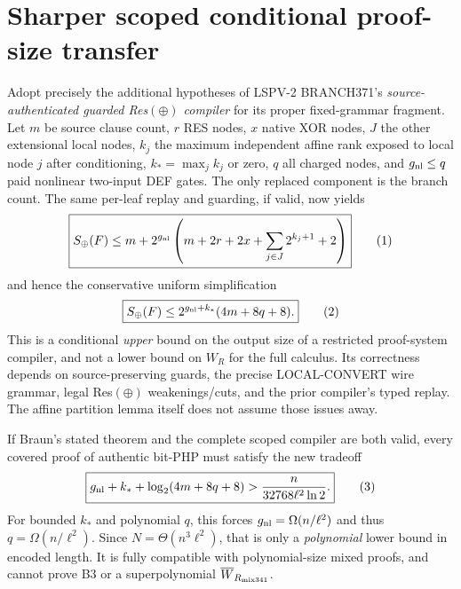 \documentclass[11pt]{article}
\begin{document}
\section*{Sharper scoped conditional proof-size transfer}
Adopt precisely the additional hypotheses of LSPV-2 BRANCH371's \emph{source-authenticated guarded Res$(\oplus)$ compiler} for its proper fixed-grammar fragment. Let $m$ be source clause count, $r$ RES nodes, $x$ native XOR nodes, $J$ the other extensional local nodes, $k_j$ the maximum independent affine rank exposed to local node $j$ after conditioning, $k_*=\max_j k_j$ or zero, $q$ all charged nodes, and $g_{\rm nl}\le q$ paid nonlinear two-input DEF gates. The only replaced component is the branch count. The same per-leaf replay and guarding, if valid, now yields
\[
\boxed{S_{\oplus}(F)\le m+2^{g_{\rm nl}}\left(m+2r+2x+\sum_{j\in J}2^{k_j+1}+2\right)}
\tag{1}
\]
and hence the conservative uniform simplification
\[
\boxed{S_{\oplus}(F)\le 2^{g_{\rm nl}+k_*}(4m+8q+8).}
\tag{2}
\]
This is a conditional \emph{upper} bound on the output size of a restricted proof-system compiler, and not a lower bound on $W_R$ for the full calculus. Its correctness depends on source-preserving guards, the precise LOCAL-CONVERT wire grammar, legal Res$(\oplus)$ weakenings/cuts, and the prior compiler's typed replay. The affine partition lemma itself does not assume those issues away.

If Braun's stated theorem and the complete scoped compiler are both valid, every covered proof of authentic bit-PHP must satisfy the new tradeoff
\[
\boxed{
g_{\rm nl}+k_*+\log_2(4m+8q+8)>
\frac{n}{32768\ell^2\ln2}.}
\tag{3}
\]
For bounded $k_*$ and polynomial $q$, this forces $g_{\rm nl}=\Omega(n/\ell^2)$ and thus $q=\Omega(n/\ell^2)$. Since $N=\Theta(n^3\ell^2)$, that is only a \emph{polynomial} lower bound in encoded length. It is fully compatible with polynomial-size mixed proofs, and cannot prove B3 or a superpolynomial $\overline W_{R_{\rm mix341}}$.
\end{document}

